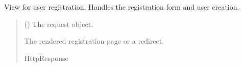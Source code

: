 \documentclass[letterpaper,10pt,english]{sphinxmanual}
\begin{document}

\begin{fulllineitems}
\label{\detokenize{modules/views:account.views.register}}
\pysigstartsignatures
{}
\pysigstopsignatures
\sphinxAtStartPar
View for user registration. Handles the registration form and user creation.
\begin{quote}\begin{description}
\sphinxAtStartPar
{} () \textendash{} The request object.

\sphinxAtStartPar
The rendered registration page or a redirect.

\sphinxAtStartPar
HttpResponse

\end{description}\end{quote}

\end{fulllineitems}

\end{document}

